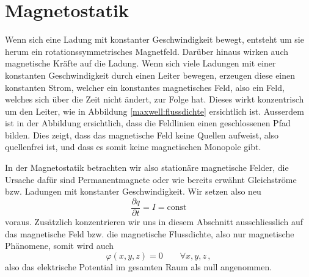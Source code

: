 %
%
%
%
\section{Magnetostatik\label{maxwell:magnetostatik}}


Wenn sich eine Ladung mit konstanter Geschwindigkeit bewegt, entsteht um sie herum ein rotationssymmetrisches Magnetfeld. Darüber hinaus wirken auch magnetische Kräfte auf die Ladung.
Wenn sich viele Ladungen mit einer konstanten Geschwindigkeit durch einen Leiter bewegen, erzeugen diese einen konstanten Strom, welcher ein konstantes magnetisches Feld, also ein Feld, welches sich über die Zeit nicht ändert, zur Folge hat. Dieses wirkt konzentrisch um den Leiter, wie in Abbildung \ref{maxwell:flussdichte} ersichtlich ist. Ausserdem ist in der Abbildung ersichtlich, dass die Feldlinien einen geschlossenen Pfad bilden. Dies zeigt, dass das magnetische Feld keine Quellen aufweist, also quellenfrei ist, und dass es somit keine magnetischen Monopole gibt.

In der Magnetostatik betrachten wir also stationäre magnetische Felder, die Ursache dafür sind Permanentmagnete oder wie bereits erwähnt Gleichströme bzw. Ladungen mit konstanter Geschwindigkeit.
Wir setzen also neu
\[ 
\frac{\partial q}{\partial t}
=
I
=
\text{const}
\]
voraus.
Zusätzlich konzentrieren wir uns in diesem Abschnitt ausschliesslich auf das magnetische Feld bzw. die magnetische Flussdichte, also nur magnetische Phänomene, somit wird auch
\[\varphi(x,y,z) = 0 \qquad \forall x,y,z\, ,\] 
also das elektrische Potential im gesamten Raum als null angenommen. 



